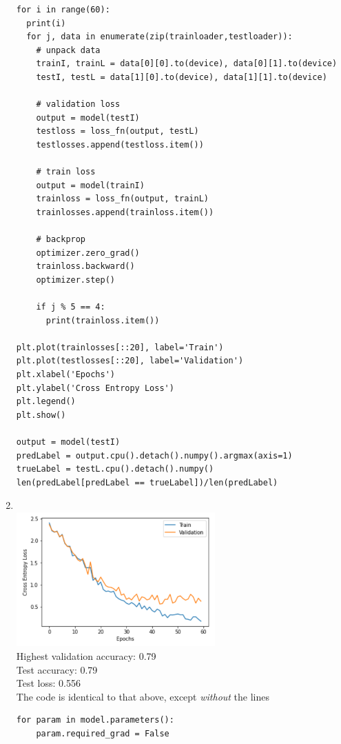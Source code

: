 \documentclass{article}
\begin{document}
\begin{enumerate}
\begin{verbatim}
for i in range(60):
  print(i)
  for j, data in enumerate(zip(trainloader,testloader)):
    # unpack data
    trainI, trainL = data[0][0].to(device), data[0][1].to(device)
    testI, testL = data[1][0].to(device), data[1][1].to(device)

    # validation loss
    output = model(testI)
    testloss = loss_fn(output, testL)
    testlosses.append(testloss.item())

    # train loss
    output = model(trainI)
    trainloss = loss_fn(output, trainL)
    trainlosses.append(trainloss.item())

    # backprop
    optimizer.zero_grad()
    trainloss.backward()
    optimizer.step()

    if j % 5 == 4:
      print(trainloss.item())

plt.plot(trainlosses[::20], label='Train')
plt.plot(testlosses[::20], label='Validation')
plt.xlabel('Epochs')
plt.ylabel('Cross Entropy Loss')
plt.legend()
plt.show()

output = model(testI)
predLabel = output.cpu().detach().numpy().argmax(axis=1)
trueLabel = testL.cpu().detach().numpy()
len(predLabel[predLabel == trueLabel])/len(predLabel)
        \end{verbatim} 
        
        \newpage

        \item \, \\
        \includegraphics[width=0.6\textwidth]{code/A3b.png} \\
        Highest validation accuracy: 0.79 \\
        Test accuracy: 0.79 \\
        Test loss: 0.556 \\
        The code is identical to that above, except \textit{without} the lines
        \begin{verbatim}
for param in model.parameters():
    param.required_grad = False
        \end{verbatim}
\end{enumerate}
\end{document}
